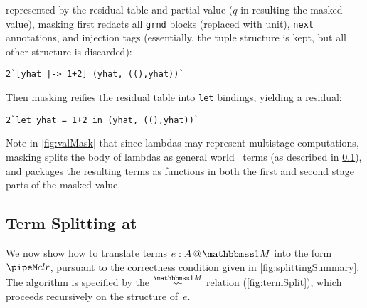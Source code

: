 \begin{abstrsyn}
represented by the residual table and partial value ($q$ in resulting
the masked value), masking first redacts all \texttt{grnd} blocks
(replaced with unit), \texttt{next} annotations, and injection tags
(essentially, the tuple structure is kept, but all other structure is
discarded):
\begin{lstlisting}
2`[yhat |-> 1+2] (yhat, ((),yhat))`
\end{lstlisting}
Then masking reifies the residual table into \texttt{let} bindings,
yielding a residual:
\begin{lstlisting}
2`let yhat = 1+2 in (yhat, ((),yhat))`
\end{lstlisting}

Note in \ref{fig:valMask} that since lambdas may represent multistage
computations, masking splits the body of lambdas as general world
\bbonem\ terms (as described in \ref{sec:split-one}), and packages the
resulting terms as functions in both the first and second stage parts
of the masked value.



\subsection{Term Splitting at \bbonem}
\label{sec:split-one}

We now show how to translate terms $\colmix e A$ into the form $\pipeM c l r$,
pursuant to the correctness condition given in \ref{fig:splittingSummary}.
The algorithm is specified by the $\splitonesym$ relation (\cref{fig:termSplit}), 
which proceeds recursively on the structure of~$e$.


\end{abstrsyn}
